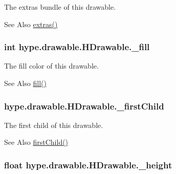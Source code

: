The extras bundle of this drawable. 

\begin{DoxySeeAlso}{See Also}
\hyperlink{classhype_1_1drawable_1_1_h_drawable_a7505189d57beed823910e448eada428e}{extras()} 
\end{DoxySeeAlso}
\hypertarget{classhype_1_1drawable_1_1_h_drawable_a3f0dce6dfbc31cc1538d8e21c9c12194}{
\subsubsection[{\-\_\-fill}]{\setlength{\rightskip}{0pt plus 5cm}int hype.\-drawable.\-H\-Drawable.\-\_\-fill\hspace{0.3cm}{\ttfamily [protected]}}}\label{classhype_1_1drawable_1_1_h_drawable_a3f0dce6dfbc31cc1538d8e21c9c12194}


The fill color of this drawable. 

\begin{DoxySeeAlso}{See Also}
\hyperlink{classhype_1_1drawable_1_1_h_drawable_a062e20742be8718d6069e7b50b1ebf36}{fill()} 
\end{DoxySeeAlso}
\hypertarget{classhype_1_1drawable_1_1_h_drawable_a69d5c4b696ca07da01e245a88348962d}{
\subsubsection[{\-\_\-first\-Child}]{ hype.\-drawable.\-H\-Drawable.\-\_\-first\-Child\hspace{0.3cm}{\ttfamily [protected]}}}\label{classhype_1_1drawable_1_1_h_drawable_a69d5c4b696ca07da01e245a88348962d}


The first child of this drawable. 

\begin{DoxySeeAlso}{See Also}
\hyperlink{classhype_1_1drawable_1_1_h_drawable_a3e5cc588f5e3c3357ca5db38f969af3e}{first\-Child()} 
\end{DoxySeeAlso}
\hypertarget{classhype_1_1drawable_1_1_h_drawable_ad6213a21c5284ead8f127b1da90b9902}{
\subsubsection[{\-\_\-height}]{\setlength{\rightskip}{0pt plus 5cm}float hype.\-drawable.\-H\-Drawable.\-\_\-height\hspace{0.3cm}{\ttfamily [protected]}}}\label{classhype_1_1drawable_1_1_h_drawable_ad6213a21c5284ead8f127b1da90b9902}


